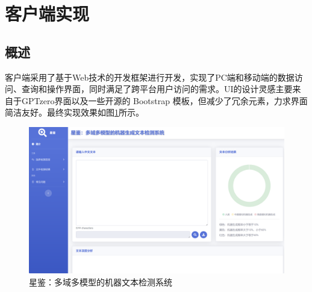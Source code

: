 \documentclass[a4paper]{report}
\begin{document}
\section{客户端实现}
\subsection{概述}
客户端采用了基于Web技术的开发框架进行开发，实现了PC端和移动端的数据访问、查询和操作界面，同时满足了跨平台用户访问的需求。UI的设计灵感主要来自于GPTzero界面以及一些开源的 Bootstrap 模板，但减少了冗余元素，力求界面简洁友好。最终实现效果如图\ref{星鉴：多域多模型的机器文本检测系统}所示。
\begin{figure}[H]
	\centering
	\includegraphics[width=\textwidth]{figures/系统主页.png}
	\caption{星鉴：多域多模型的机器文本检测系统}
	\label{星鉴：多域多模型的机器文本检测系统}
\end{figure}
\end{document}
